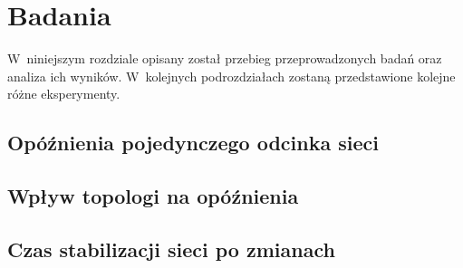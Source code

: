 \section{Badania}
W~niniejszym rozdziale opisany został przebieg przeprowadzonych badań oraz analiza ich wyników. W~kolejnych podrozdziałach zostaną przedstawione kolejne różne eksperymenty. 

\subsection{Opóźnienia pojedynczego odcinka sieci}
\subsection{Wpływ topologi na opóźnienia}
\subsection{Czas stabilizacji sieci po zmianach}